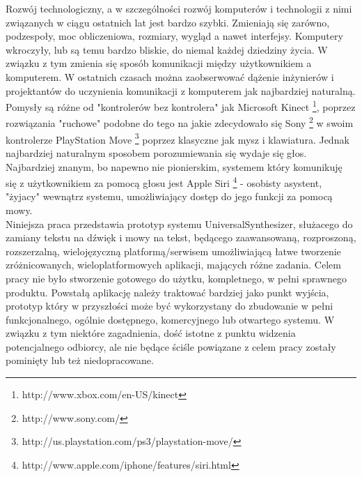

\begin{abstracts}        %

Rozwój technologiczny, a w szczególności rozwój komputerów i technologii z nimi związanych w ciągu ostatnich lat jest bardzo szybki. Zmieniają się zarówno, podzespoły, moc obliczeniowa, rozmiary, wygląd a nawet interfejsy. Komputery wkroczyły, lub są temu bardzo bliskie, do niemal każdej dziedziny życia. W związku z tym zmienia się sposób komunikacji między użytkownikiem a komputerem. W ostatnich czasach można zaobserwować dążenie inżynierów i projektantów do uczynienia komunikacji z komputerem jak najbardziej naturalną. Pomysły są różne od "kontrolerów bez kontrolera" jak Microsoft Kinect \footnote {http://www.xbox.com/en-US/kinect}, poprzez rozwiązania "ruchowe" podobne do tego na jakie zdecydowało się Sony \footnote{http://www.sony.com/} w swoim kontrolerze PlayStation Move \footnote{http://us.playstation.com/ps3/playstation-move/} poprzez klasyczne  jak mysz i klawiatura. Jednak najbardziej naturalnym sposobem porozumiewania się wydaje się głos. Najbardziej znanym, bo napewno nie pionierskim, systemem który komunikuję się z użytkownikiem za pomocą głosu jest Apple Siri \footnote{http://www.apple.com/iphone/features/siri.html} - osobisty asystent, "żyjacy" wewnątrz systemu, umożliwiający dostęp do jego funkcji za pomocą mowy.\\
Niniejsza praca przedstawia prototyp systemu UniversalSynthesizer, służacego do zamiany tekstu na dźwięk i mowy na tekst, będącego zaawansowaną, rozproszoną, rozszerzalną, wielojęzyczną platformą/serwisem umożliwiającą łatwe tworzenie zróżnicowanych, wieloplatformowych aplikacji, mających różne zadania. Celem pracy nie było stworzenie gotowego do użytku, kompletnego, w pełni sprawnego produktu. Powstałą aplikację należy traktować bardziej jako punkt wyjścia, prototyp który w przyszłości może być wykorzystany do zbudowanie w pełni funkcjonalnego, ogólnie dostępnego, komercyjnego lub otwartego systemu. W związku z tym niektóre zagadnienia, dość istotne z punktu widzenia potencjalnego odbiorcy, ale nie będące ściśle powiązane z celem pracy zostały pominięty lub też niedopracowane. 
\end{abstracts}


